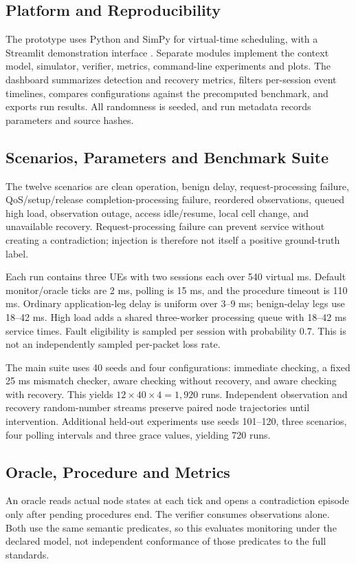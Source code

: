 \documentclass[conference]{IEEEtran}
\begin{document}
\subsection{Platform and Reproducibility}
The prototype uses Python and SimPy for virtual-time scheduling, with a Streamlit demonstration interface \cite{simpy,streamlit}. Separate modules implement the context model, simulator, verifier, metrics, command-line experiments and plots. The dashboard summarizes detection and recovery metrics, filters per-session event timelines, compares configurations against the precomputed benchmark, and exports run results. All randomness is seeded, and run metadata records parameters and source hashes.

\subsection{Scenarios, Parameters and Benchmark Suite}
The twelve scenarios are clean operation, benign delay, request-processing failure, QoS/setup/release completion-processing failure, reordered observations, queued high load, observation outage, access idle/resume, local cell change, and unavailable recovery. Request-processing failure can prevent service without creating a contradiction; injection is therefore not itself a positive ground-truth label.

Each run contains three UEs with two sessions each over 540 virtual ms. Default monitor/oracle ticks are 2 ms, polling is 15 ms, and the procedure timeout is 110 ms. Ordinary application-leg delay is uniform over 3--9 ms; benign-delay legs use 18--42 ms. High load adds a shared three-worker processing queue with 18--42 ms service times. Fault eligibility is sampled per session with probability 0.7. This is not an independently sampled per-packet loss rate.

The main suite uses 40 seeds and four configurations: immediate checking, a fixed 25 ms mismatch checker, aware checking without recovery, and aware checking with recovery. This yields $12\times40\times4=1,920$ runs. Independent observation and recovery random-number streams preserve paired node trajectories until intervention. Additional held-out experiments use seeds 101--120, three scenarios, four polling intervals and three grace values, yielding 720 runs.

\subsection{Oracle, Procedure and Metrics}
An oracle reads actual node states at each tick and opens a contradiction episode only after pending procedures end. The verifier consumes observations alone. Both use the same semantic predicates, so this evaluates monitoring under the declared model, not independent conformance of those predicates to the full standards.
\end{document}
